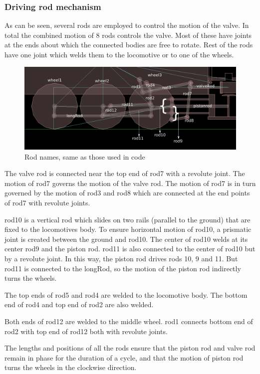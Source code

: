 \documentclass[pdftex,12pt,a4paper]{article}
\begin{document}
\subsubsection{Driving rod mechanism}

\par{As can be seen, several rods are employed to control the motion of the valve. In total the combined motion of 8 rods controls the valve. Most of these have joints at the ends about which the connected bodies are free to rotate. Rest of the rods have one joint which welds them to the locomotive or to one of the wheels.}

\begin{figure}[H]
\centering
\includegraphics[scale=.37]{../images/labels.png}
\caption{Rod names, same as those used in code}
\end{figure}

\par{The valve rod is connected near the top end of rod7 with a revolute joint. The motion of rod7 governs the motion of the valve rod. The motion of rod7 is in turn governed by the motion of rod3 and rod8 which are connected at the end points of rod7 with revolute joints.}
\par{rod10 is a vertical rod which slides on two rails (parallel to the ground) that are fixed to the locomotives body. To ensure horizontal motion of rod10, a prismatic joint is created between the ground and rod10. The center of rod10 welds at its center rod9 and the piston rod. rod11 is also connected to the center of rod10 but by a revolute joint. In this way, the piston rod drives rods 10, 9 and 11. But rod11 is connected to the longRod, so the motion of the piston rod indirectly turns the wheels.}
\par{The top ends of rod5 and rod4 are welded to the locomotive body. The bottom end of rod4 and top end of rod2 are also welded.}
\par{Both ends of rod12 are welded to the middle wheel. rod1 connects bottom end of rod2 with top end of rod12 both with revolute joints.}
\par{The lengths and positions of all the rods ensure that the piston rod and valve rod remain in phase for the duration of a cycle, and that the motion of piston rod turns the wheels in the clockwise direction.}
\end{document}
